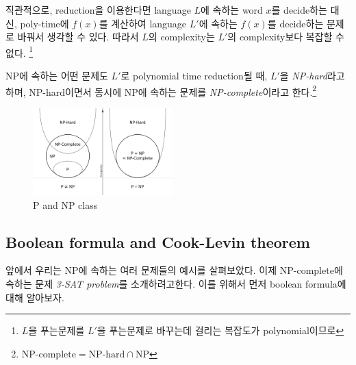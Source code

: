 직관적으로, reduction을 이용한다면 language $L$에 속하는 word $x$를 decide하는 대신, poly-time에 $f(x)$를 계산하여 language $L'$에 속하는 $f(x)$를 decide하는 문제로 바꿔서 생각할 수 있다. 따라서 $L$의 complexity는 $L'$의 complexity보다 복잡할 수 없다. \footnote{$L$을 푸는문제를 $L'$을 푸는문제로 바꾸는데 걸리는 복잡도가 polynomial이므로}

\begin{definition}\label{def:NP-complete}
    NP에 속하는 어떤 문제도 $L'$로 polynomial time reduction될 때, $L'$을 \textit{NP-hard}라고 하며, NP-hard이면서 동시에 NP에 속하는 문제를 \textit{NP-complete}이라고 한다.\footnote{$\text{NP-complete} = \text{NP-hard} \cap \text{NP}$}
\end{definition}

\begin{figure}[h]
    \centering
    \includegraphics[width=0.48\textwidth]{figures/P_np_np-complete_np-hard.png}
    \caption{P and NP class \cite{NP-wiki}}
    \label{fig:NP-class}
\end{figure}

\subsection{Boolean formula and Cook-Levin theorem}
앞에서 우리는 NP에 속하는 여러 문제들의 예시를 살펴보았다. 이제 NP-complete에 속하는 문제 \textit{3-SAT problem}를 소개하려고한다. 이를 위해서 먼저 boolean formula에 대해 알아보자.

